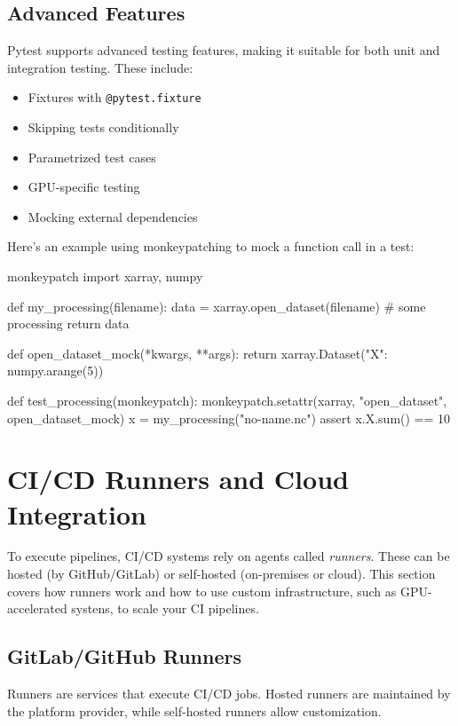 \subsection{Advanced Features}
Pytest supports advanced testing features, making it suitable for both unit and integration testing. These include:

\begin{itemize}
\item Fixtures with \texttt{@pytest.fixture}
\item Skipping tests conditionally
\item Parametrized test cases
\item GPU-specific testing
\item Mocking external dependencies
\end{itemize}

Here's an example using monkeypatching to mock a function call in a test:

\begin{codeonly}{monkeypatch}
import xarray, numpy

def my_processing(filename):
    data = xarray.open_dataset(filename)
    # some processing
    return data

def open_dataset_mock(*kwargs, **args):
    return xarray.Dataset({"X": numpy.arange(5)})

def test_processing(monkeypatch):
    monkeypatch.setattr(xarray, "open_dataset", open_dataset_mock)
    x = my_processing("no-name.nc")
    assert x.X.sum() == 10
\end{codeonly}

%
\section{CI/CD Runners and Cloud Integration}
To execute pipelines, CI/CD systems rely on agents called \emph{runners}. These can be hosted (by GitHub/GitLab) or self-hosted (on-premises or cloud). This section covers how runners work and how to use custom infrastructure, such as GPU-accelerated systens, to scale your CI pipelines.

%
\subsection{GitLab/GitHub Runners}
Runners are services that execute CI/CD jobs. Hosted runners are maintained by the platform provider, while self-hosted runners allow customization.

